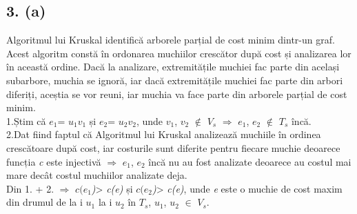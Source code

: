 \documentclass[12pt] {fphw}
\begin{document}
\subsection*{3. (a)} 
  Algoritmul lui Kruskal identifică arborele parțial de cost minim dintr-un graf. Acest algoritm constă în ordonarea muchiilor crescător după cost și analizarea lor în această ordine. Dacă la analizare, extremitățile muchiei fac parte din același subarbore, muchia se ignoră, iar dacă extremitățile muchiei fac parte din arbori diferiți, aceștia se vor reuni, iar muchia va face parte din arborele parțial de cost minim. \\
  1.Știm că  \textit{ ${}e_{1}$}= \textit{  ${}u_{1}$${}v_{1}$} și  \textit{ ${}e_{2}$}= \textit{  ${}u_{2}$${}v_{2}$}, unde  \textit{ ${}v_{1}$}, \textit{ ${}v_{2}$} $\notin$  \textit{ ${}V_{s}$} $\Rightarrow$ \textit{ ${}e_{1}$}, \textit{ ${}e_{2}$} $\notin$  \textit{ ${}T_{s}$} încă. \\
  2.Dat fiind faptul că Algoritmul lui Kruskal analizează muchiile în ordinea crescătoare după cost, iar costurile sunt diferite pentru fiecare muchie deoarece funcția \textit{c} este injectivă $\Rightarrow$ \textit{ ${}e_{1}$}, \textit{ ${}e_{2}$} încă nu au fost analizate deoarece au costul mai mare decât costul muchiilor analizate deja. \\
Din 1. + 2. $\Rightarrow$  \textit{ ${}c(e_{1}$)}> \textit{ c(e)} și  \textit{ ${}c(e_{2}$)}> \textit{ c(e)}, unde  \textit{e} este o muchie de cost maxim din drumul de la i  \textit{ ${}u_{1}$} la i  \textit{ ${}u_{2}$} în \textit{ ${}T_{s}$},  \textit{ ${}u_{1}$}, \textit{ ${}u_{2}$} $\in$  \textit{ ${}V_{s}$}.
\end{document}
